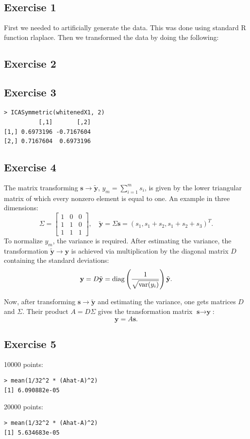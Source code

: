 \documentclass{article}
\begin{document}
\subsection{Exercise 1}
First we needed to artificially generate the data. This was done using
standard R function rlaplace. Then we transformed the data by doing
the following:

\subsection{Exercise 2}
\subsection{Exercise 3}
\begin{verbatim}
> ICASymmetric(whitenedX1, 2)
          [,1]       [,2]
[1,] 0.6973196 -0.7167604
[2,] 0.7167604  0.6973196
\end{verbatim}
\subsection{Exercise 4}
The matrix transforming $\textbf{s} \to \tilde{\textbf{y}}$, $y_m = \sum_{i=1}^m s_i$, is given by
the lower triangular matrix of which every nonzero element is equal to
one. An example in three dimensions:
\[
\Sigma =
\left[ \begin{array}{ccc}
1 & 0 & 0 \\
1 & 1 & 0 \\
1 & 1 & 1 \end{array} \right],
\quad
\tilde{\textbf{y}} = \Sigma \textbf{s} = (s_1, s_1 + s_2, s_1 + s_2 + s_3)^T.
\]
To normalize $y_m$, the variance is required. After estimating
the variance, the transformation $\tilde{\textbf{y}} \to \textbf{y}$
is achieved via multiplication by the diagonal matrix $D$ containing the
standard deviations: 
\[
\textbf{y} = D \tilde{\textbf{y}}= \textup{diag} \left( \frac{1}{\sqrt{\textup{var}(y_i)}}
\right) \tilde{\textbf{y}}.
\]

Now, after transforming $\textbf{s} \to \tilde{\textbf{y}}$ and
estimating the variance, one gets matrices $D$ and $\Sigma$. Their
product $A = D \Sigma$ gives the transformation matrix $\textbf{s} \to
\textbf{y}$:
\[
\textbf{y} = A\textbf{s}.
\]
\subsection{Exercise 5}
10000 points:
\begin{verbatim}
> mean(1/32^2 * (Ahat-A)^2)
[1] 6.090882e-05
\end{verbatim}
20000 points:
\begin{verbatim}
> mean(1/32^2 * (Ahat-A)^2)
[1] 5.634683e-05
\end{verbatim}
\end{document}
